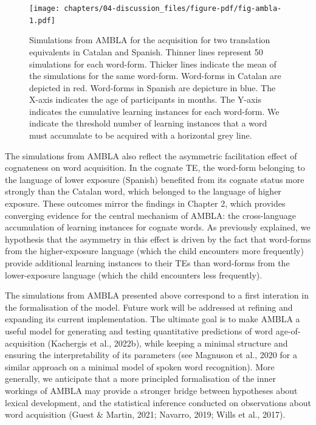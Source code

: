 \documentclass[
  12pt,
  b5paperpaper,
  twoside]{scrreprt}
\begin{document}
\newpage

\begin{figure}

{\centering \texttt{[image: chapters/04-discussion\_files/figure-pdf/fig-ambla-1.pdf]}

}

\caption{\label{fig-ambla}Simulations from AMBLA for the acquisition for
two translation equivalents in Catalan and Spanish. Thinner lines
represent 50 simulations for each word-form. Thicker lines indicate the
mean of the simulations for the same word-form. Word-forms in Catalan
are depicted in red. Word-forms in Spanish are depicture in blue. The
X-axis indicates the age of participants in months. The Y-axis indicates
the cumulative learning instances for each word-form. We indicate the
threshold number of learning instances that a word must accumulate to be
acquired with a horizontal grey line.}

\end{figure}

The simulations from AMBLA also reflect the asymmetric facilitation
effect of cognateness on word acquisition. In the cognate TE, the
word-form belonging to the language of lower exposure (Spanish)
benefited from its cognate status more strongly than the Catalan word,
which belonged to the language of higher exposure. These outcomes mirror
the findings in Chapter 2, which provides converging evidence for the
central mechanism of AMBLA: the cross-language accumulation of learning
instances for cognate words. As previously explained, we hypothesis that
the asymmetry in this effect is driven by the fact that word-forms from
the higher-exposure language (which the child encounters more
frequently) provide additional learning instances to their TEs than
word-forms from the lower-exposure language (which the child encounters
less frequently).

The simulations from AMBLA presented above correspond to a first
interation in the formalisation of the model. Future work will be
addressed at refining and expanding its current implementation. The
ultimate goal is to make AMBLA a useful model for generating and testing
quantitative predictions of word age-of-acquisition (Kachergis et al.,
2022b), while keeping a minimal structure and ensuring the
interpretability of its parameters (see Magnuson et al., 2020 for a
similar approach on a minimal model of spoken word recognition). More
generally, we anticipate that a more principled formalisation of the
inner workings of AMBLA may provide a stronger bridge between hypotheses
about lexical development, and the statistical inference conducted on
observations about word acquisition (Guest \& Martin, 2021; Navarro,
2019; Wills et al., 2017).
\end{document}
